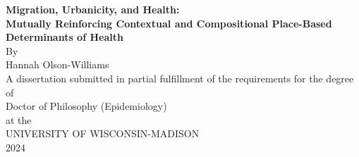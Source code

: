 \documentclass[12pt]{book} %
\begin{document}


\newpage
\thispagestyle{empty} %
\begin{center}
    {\Large \textbf{Migration, Urbanicity, and Health:}}\\
    {\Large \textbf{Mutually Reinforcing Contextual and Compositional Place-Based Determinants of Health}}\\
    \vspace{1cm}
    By\\
    {\large Hannah Olson-Williams}\\
    \vspace{1cm}
    A dissertation submitted in partial fulfillment of the requirements for the degree of\\
    Doctor of Philosophy (Epidemiology)\\
    at the\\
    UNIVERSITY OF WISCONSIN-MADISON\\
    2024
\end{center}
\newpage
\end{document}
